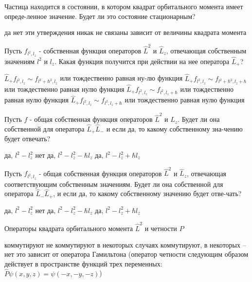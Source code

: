 \documentclass[11pt,a4paper]{exam}
\begin{document}
\begin{questions}
\question Частица находится в состоянии, в котором квадрат орбитального момента имеет опреде-ленное значение. Будет ли это состояние стационарным?
\begin{choices}
\choice да                   
\choice нет
\choice эти утверждения никак не связаны    
\choice зависит от величины квадрата момента
\end{choices}

\question Пусть ${f_{{l^2},{l_z}}}$ - собственная функция операторов ${\hat L^2}$ и ${\hat L_z}$, отвечающая собственным значениям ${l^2}$ и ${l_z}$. Какая функция получится при действии на нее оператора ${\hat L_ + }$? 
\begin{choices}
\choice ${\hat L_ + }{f_{{l^2},{l_z}}} \sim {f_{{l^2} + {\hbar ^2},{l_z}}}$ или тождественно равная ну-лю функция
\choice ${\hat L_ + }{f_{{l^2},{l_z}}} \sim {f_{{l^2} + {\hbar ^2},{l_z} + \hbar }}$ или тождественно равная нулю функция
\choice ${\hat L_ + }{f_{{l^2},{l_z}}} \sim {f_{{l^2},{l_z} + \hbar }}$ или тождественно равная нулю функция
\choice ${\hat L_ + }{f_{{l^2},{l_z}}} \sim {f_{{l^2},{l_z} + \hbar }}$ или тождественно равная нулю функция
\end{choices}

\question Пусть $f$ - общая собственная функция операторов ${\hat L^2}$ и ${\hat L_z}$. Будет ли она собственной для оператора ${\hat L_ + }{\hat L_ - }$ и если да, то какому собственному зна-чению будет отвечать?
\begin{choices}
\choice да, ${l^2} - l_z^2$           
\choice нет
\choice да, ${l^2} - l_z^2 - \hbar {l_z}$         
\choice да, ${l^2} - l_z^2 + \hbar {l_z}$
\end{choices}

\question Пусть ${f_{{l^2},{l_z}}}$ - общая собственная функция операторов ${\hat L^2}$ и ${\hat L_z}$, отвечающая соответствующим собственным значениям. Будет ли она собственной для оператора ${\hat L_ - }{\hat L_ + }$, и если да, то какому собственному значению будет отве-чать?
\begin{choices}
\choice да, ${l^2} - l_z^2$           
\choice нет
\choice да, ${l^2} - l_z^2 - \hbar {l_z}$         
\choice да, ${l^2} - l_z^2 + \hbar {l_z}$
\end{choices}

\question Операторы квадрата орбитального момента ${\hat L^2}$ и четности $\hat P$ 
\begin{choices}
\choice коммутируют
\choice не коммутируют
\choice в некоторых случаях коммутируют, в некоторых – нет
\choice это зависит от оператора Гамильтона
(оператор четности следующим образом действует в пространстве функций трех переменных: $\hat P\psi (x,y,z) = \psi ( - x, - y, - z)$)
\end{choices}


\end{questions}
\end{document}
